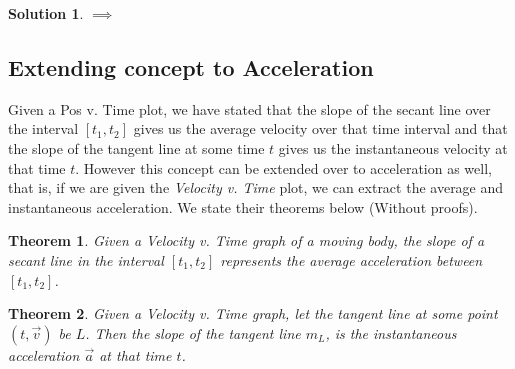 \documentclass[12pt]{article}
\theoremstyle{break}
\newtheorem{thm}{Theorem}[subsection]
\newtheorem*{soln}{Solution}
\begin{document}
\begin{soln}
$\implies$

\vspace*{4cm}
\end{soln}
\subsection{Extending concept to Acceleration}
Given a Pos v. Time plot, we have stated that the slope of the secant line over the interval $[t_1,t_2]$ gives us the average velocity over that time interval and that the slope of the tangent line at some time $t$ gives us the instantaneous velocity at that time $t$. However this concept can be extended over to acceleration as well, that is, if we are given the \emph{Velocity v. Time} plot, we can extract the average and instantaneous acceleration. We state their theorems below (Without proofs).
\begin{thm}
	Given a Velocity v. Time graph of a moving body, the slope of a secant line in the interval $[t_1,t_2]$ represents the average acceleration between $[t_1,t_2]$.
\end{thm}

\begin{thm}
	Given a Velocity v. Time graph, let the tangent line at some point $(t, \vec v)$ be $L$. Then the slope of the tangent line $m_L$, is the instantaneous acceleration $\vec a$ at that time $t$.
\end{thm}
\end{document}
